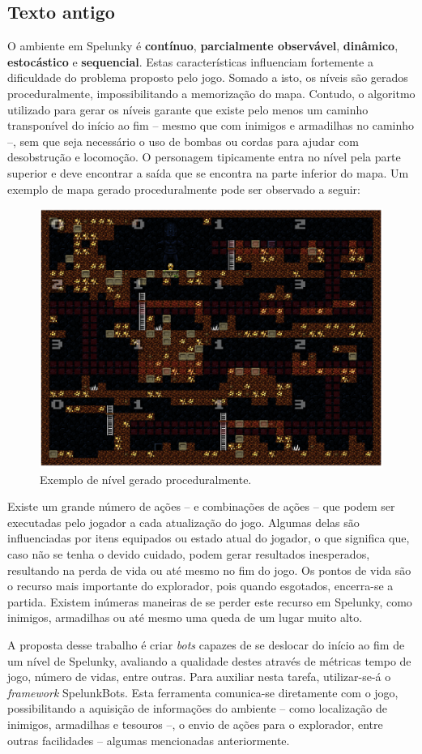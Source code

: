 \subsection{Texto antigo}
O ambiente em Spelunky é \textbf{contínuo}, \textbf{parcialmente observável},
\textbf{dinâmico}, \textbf{estocástico} e \textbf{sequencial}. Estas
características influenciam fortemente a dificuldade do problema proposto pelo
jogo. Somado a isto, os níveis são gerados proceduralmente, impossibilitando a
memorização do mapa. Contudo, o algoritmo utilizado para gerar os níveis garante
que existe pelo menos um caminho transponível do início ao fim -- mesmo que com
inimigos e armadilhas no caminho --, sem que seja necessário o uso de bombas ou
cordas para ajudar com desobstrução e locomoção. O personagem tipicamente entra
no nível pela parte superior e deve encontrar a saída que se encontra na parte
inferior do mapa. Um exemplo de mapa gerado proceduralmente pode ser observado a
seguir:

\begin{figure}[htb!]
\centering\includegraphics[width=.65\textwidth]{fig/spelunky-level-example.png}
\caption {\label{fig:spelunky-level-example}Exemplo de nível gerado
proceduralmente.} \end{figure}

Existe um grande número de ações -- e combinações de ações -- que podem ser
executadas pelo jogador a cada atualização do jogo. Algumas delas são
influenciadas por itens equipados ou estado atual do jogador, o que significa
que, caso não se tenha o devido cuidado, podem gerar resultados inesperados,
resultando na perda de vida ou até mesmo no fim do jogo. Os pontos de vida são o
recurso mais importante do explorador, pois quando esgotados, encerra-se a
partida. Existem inúmeras maneiras de se perder este recurso em Spelunky, como
inimigos, armadilhas ou até mesmo uma queda de um lugar muito alto.

A proposta desse trabalho é criar \textit{bots} capazes de se deslocar do início
ao fim de um nível de Spelunky, avaliando a qualidade destes através de métricas
tempo de jogo, número de vidas, entre outras.  Para auxiliar nesta tarefa,
utilizar-se-á o \textit{framework} SpelunkBots.  Esta ferramenta comunica-se
diretamente com o jogo, possibilitando a aquisição de informações do ambiente --
como localização de inimigos, armadilhas e tesouros --, o envio de ações para o
explorador, entre outras facilidades -- algumas mencionadas anteriormente.
